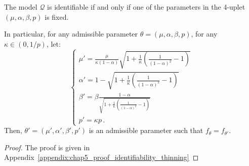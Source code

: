     \begin{proposition}\label{prop:chap5_identifiability_thinning}
        The model $\mathcal{Q}$ is identifiable if and only if one of the parameters in the 4-uplet $(\mu, \alpha, \beta, p)$ is fixed.

        In particular, for any admissible parameter $\theta = (\mu, \alpha, \beta, p)$,
        for any $\kappa\in(0, 1/p)$, let:
        \begin{equation*}
        \begin{cases}
            \mu' = \frac{\mu}{\kappa(1-\alpha)} \sqrt{1+\frac{1}{\kappa}\left(\frac{1}{(1-\alpha)^2} - 1\right)}\\
            \alpha' = 1 - \sqrt{1+\frac{1}{\kappa}\left(\frac{1}{(1-\alpha)^2} - 1\right)}\\
            \beta' = \beta \frac{1-\alpha}{\sqrt{1+\frac{1}{\kappa}\left(\frac{1}{(1-\alpha)^2} - 1\right)}}\\
            p' = \kappa p\,.
          \end{cases}
        \end{equation*}
          Then, $\theta' = (\mu', \alpha', \beta', p')$ is an admissible parameter such that $f_{\theta} = f_{\theta'}$.
    \end{proposition}

    \begin{proof}
        The proof is given in Appendix~\ref{appendix:chap5_proof_identifiability_thinning}
    \end{proof}



